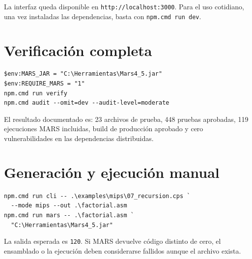\documentclass[11pt,letterpaper,oneside]{report}
\newcommand{\codigo}[1]{\texttt{#1}}
\newcommand{\archivo}[1]{\path{#1}}
\begin{document}
La interfaz queda disponible en \codigo{http://localhost:3000}. Para el uso cotidiano, una vez instaladas las dependencias, basta con \codigo{npm.cmd run dev}.

\section{Verificaci\'on completa}

\begin{verbatim}
$env:MARS_JAR = "C:\Herramientas\Mars4_5.jar"
$env:REQUIRE_MARS = "1"
npm.cmd run verify
npm.cmd audit --omit=dev --audit-level=moderate
\end{verbatim}

El resultado documentado es: 23 archivos de prueba, 448 pruebas aprobadas, 119 ejecuciones MARS incluidas, build de producci\'on aprobado y cero vulnerabilidades en las dependencias distribuidas.

\section{Generaci\'on y ejecuci\'on manual}

\begin{verbatim}
npm.cmd run cli -- .\examples\mips\07_recursion.cps `
  --mode mips --out .\factorial.asm
npm.cmd run mars -- .\factorial.asm `
  "C:\Herramientas\Mars4_5.jar"
\end{verbatim}

La salida esperada es \codigo{120}. Si MARS devuelve c\'odigo distinto de cero, el ensamblado o la ejecuci\'on deben considerarse fallidos aunque el archivo \archivo{.asm} exista.
\end{document}
